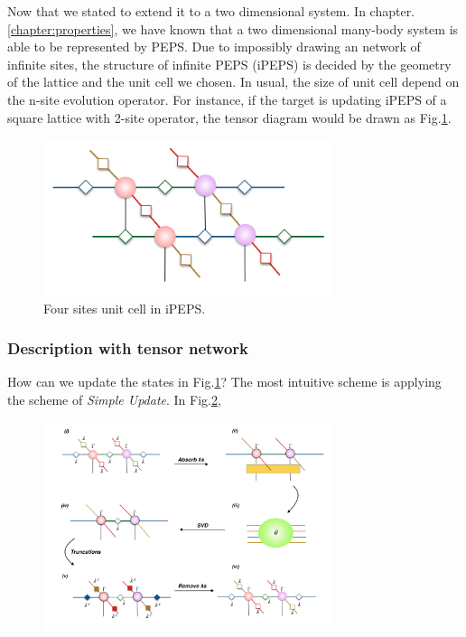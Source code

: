 Now that we stated to extend it to a two dimensional system. In chapter.\ref{chapter:properties}, we have known that a two dimensional many-body system is able to be represented by PEPS. Due to impossibly drawing an network of infinite sites, the structure of infinite PEPS (iPEPS) is decided by the geometry of the lattice and the unit cell we chosen. In usual, the size of unit cell depend on the n-site evolution operator. For instance, if the target is updating iPEPS of a square lattice with 2-site operator, the tensor diagram would be drawn as Fig.\ref{fig314}.

\begin{figure}[ht]
	\centering
	\includegraphics[width=0.75\textwidth]{figures/fig314.png}
	\caption[The tensor diagrams of 2-D lattice]{Four sites unit cell in iPEPS.}
	\label{fig314}
\end{figure}

\subsubsection{Description with tensor network}

How can we update the states in Fig.\ref{fig314}? The most intuitive scheme is applying the scheme of \textit{Simple Update}. In Fig.\ref{fig315}, 

	\begin{figure}[ht]
	\centering
	\includegraphics[width=0.75\textwidth]{figures/fig315.png}
	\caption[The tensor network diagrams for the 2-D iTEBD]{}
	\label{fig315}
	\end{figure}

